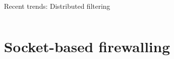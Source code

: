 \documentclass[black,white]{beamer}
\newcommand\blfootnote[1]{%
  \begingroup
  \renewcommand\thefootnote{}\footnote{#1}%
  \addtocounter{footnote}{-1}%
  \endgroup
}
\begin{document}
\begin{frame}{Recent trends: Distributed filtering}
\begin{columns}[c]
\begin{column}{0.5\textwidth}
            \end{column}
        \end{columns}
    \end{frame}


    \section{Socket-based firewalling}
\end{document}
